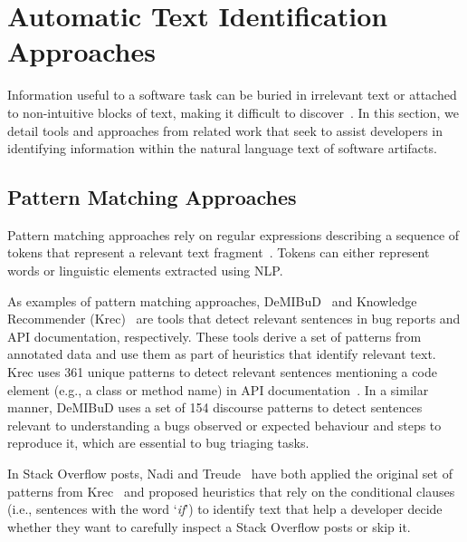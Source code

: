 \section{Automatic Text Identification Approaches}
\label{cp2:text-approaches}



Information useful to a software task can be buried in irrelevant text or attached to 
non-intuitive blocks of text, making it difficult to discover~\cite{Robillard2015}.
In this section, we detail tools and approaches from related work
that seek to assist developers in 
identifying information within the natural language
text of software artifacts.





\subsection{Pattern Matching Approaches}
\label{cp2:pattern-matching}


Pattern matching approaches rely on regular expressions describing a sequence of tokens that represent
 a relevant text fragment~\cite{Bavota2016}. Tokens can either represent words or linguistic elements 
extracted using \acf{NLP}.
    
    
As examples  of pattern matching approaches,  {\small DeMIBuD}~\cite{Chaparro2017}
 and Knowledge Recommender (Krec)~\cite{Maalej2013, Robillard2015} are tools that detect relevant sentences in bug reports and API documentation, respectively. 
These tools derive a set of patterns from annotated data and use them as part of heuristics 
that identify relevant text. Krec  uses  361 unique patterns
to 
detect relevant sentences mentioning a 
code element (e.g., a class or method name) in API documentation~\cite{Robillard2015}.
In a similar manner, {\small DeMIBuD} uses a set of 154 discourse patterns to detect sentences 
relevant to understanding a bugs observed or expected behaviour and steps to reproduce it,
which are essential to bug triaging tasks.




In Stack Overflow posts,
Nadi and Treude~\cite{nadi2020} have both applied the original set of patterns from Krec~\cite{Robillard2015} 
and proposed heuristics that rely on the conditional clauses (i.e., sentences with the word `\textit{if}')
to identify text that help a developer 
decide whether they want to carefully inspect a Stack Overflow posts or skip it. 



